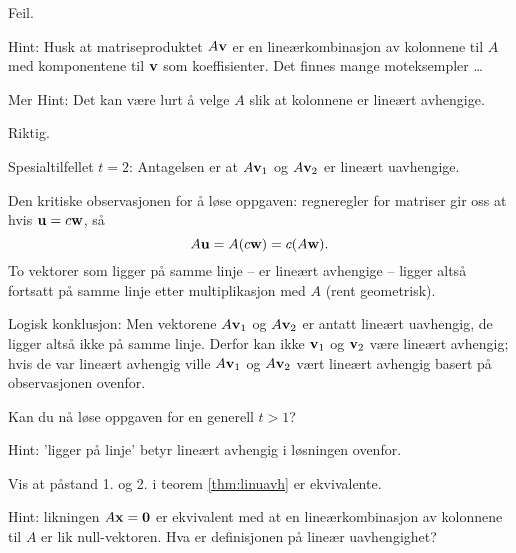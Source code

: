 \begin{losning}

\begin{punkt}
Feil.

\noindent
Hint: Husk at matriseproduktet $A\mathbf{v}$ er en lineærkombinasjon av kolonnene til $A$ med komponentene til $\mathbf{v}$ som koeffisienter. Det finnes mange moteksempler \ldots 

Mer Hint: Det kan være lurt å velge $A$ slik at kolonnene er lineært avhengige.
\end{punkt}


\begin{punkt}
Riktig.

\noindent
Spesialtilfellet $t=2$: Antagelsen er at $A\mathbf{v}_1$ og $A\mathbf{v}_2$ er lineært uavhengige. 

Den kritiske observasjonen for å løse oppgaven: regneregler for matriser gir oss at hvis $\mathbf{u}=c\mathbf{w}$, så $$A\mathbf{u}=A(c\mathbf{w})=c(A\mathbf{w}).$$ To vektorer som ligger på samme linje -- er lineært avhengige -- ligger altså fortsatt på samme linje etter multiplikasjon med $A$ (rent geometrisk).

Logisk konklusjon: Men vektorene $A\mathbf{v}_1$ og $A\mathbf{v}_2$ er antatt lineært uavhengig, de ligger altså ikke på samme linje. Derfor kan ikke $\mathbf{v}_1$ og $\mathbf{v}_2$ være lineært avhengig; hvis de var lineært avhengig ville $A\mathbf{v}_1$ og $A\mathbf{v}_2$ vært lineært avhengig basert på observasjonen ovenfor.

Kan du nå løse oppgaven for en generell $t>1$? 

\noindent
Hint: 'ligger på linje' betyr lineært avhengig i løsningen ovenfor.

\end{punkt}



\end{losning}



\begin{oppgave}
Vis at påstand 1. og 2. i teorem \ref{thm:linuavh} er ekvivalente.
\end{oppgave}

\begin{losning}
Hint: likningen $A\mathbf{x}=\mathbf{0}$ er ekvivalent med at en lineærkombinasjon av kolonnene til $A$ er lik null-vektoren. Hva er definisjonen på lineær uavhengighet?
\end{losning}





